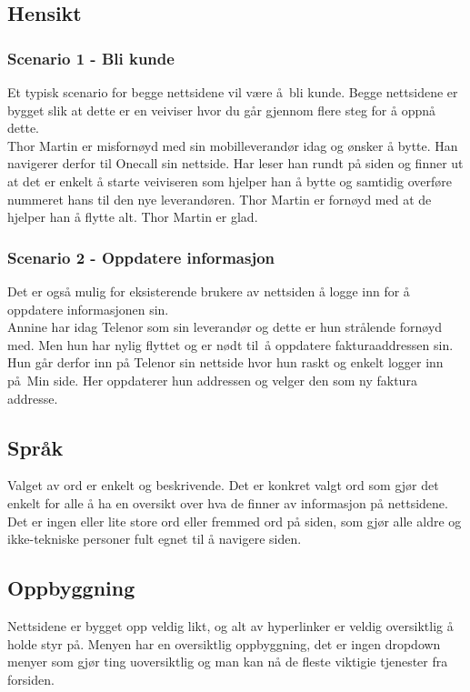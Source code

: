 \documentclass[a4paper, 10pt]{article}
\begin{document}
\subsection*{Hensikt}
\subsubsection*{Scenario 1 - Bli kunde}
Et typisk scenario for begge nettsidene vil være å bli kunde. Begge nettsidene er bygget slik at dette er en veiviser hvor du går gjennom flere steg for å oppnå dette.\\

Thor Martin er misfornøyd med sin mobilleverandør idag og ønsker å bytte. Han navigerer derfor til Onecall sin nettside. Har leser han rundt på siden og finner ut at det er enkelt å starte veiviseren som hjelper han å bytte og samtidig overføre nummeret hans til den nye leverandøren. Thor Martin er fornøyd med at de hjelper han å flytte alt. Thor Martin er glad.

\subsubsection*{Scenario 2 - Oppdatere informasjon}
Det er også mulig for eksisterende brukere av nettsiden å logge inn for å oppdatere informasjonen sin.\\

Annine har idag Telenor som sin leverandør og dette er hun strålende fornøyd med. Men hun har nylig flyttet og er nødt til å oppdatere fakturaaddressen sin. Hun går derfor inn på Telenor sin nettside hvor hun raskt og enkelt logger inn på Min side. Her oppdaterer hun addressen og velger den som ny faktura addresse.

\subsection*{Språk}
Valget av ord er enkelt og beskrivende. Det er konkret valgt ord som gjør det enkelt for alle å ha en oversikt over hva de finner av informasjon på nettsidene. Det er ingen eller lite store ord eller fremmed ord på siden, som gjør alle aldre og ikke-tekniske personer fult egnet til å navigere siden.

\subsection*{Oppbyggning}
Nettsidene er bygget opp veldig likt, og alt av hyperlinker er veldig oversiktlig å holde styr på. Menyen har en oversiktlig oppbyggning, det er ingen dropdown menyer som gjør ting uoversiktlig og man kan nå de fleste viktigie tjenester fra forsiden.
\end{document}
